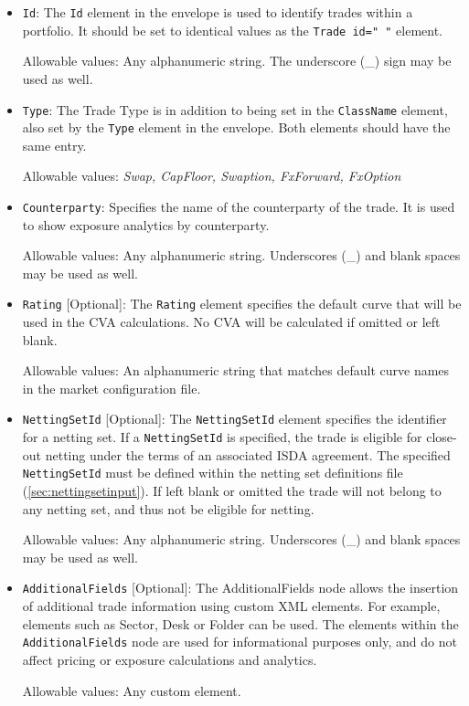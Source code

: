 \begin{itemize}
\item {\tt Id}: The {\tt Id} element in the envelope is used to identify trades within a portfolio. It should be set to
  identical values as the {\tt Trade id=" "} element.

  Allowable values: Any alphanumeric string. The underscore (\_) sign may be used as well.

\item {\tt Type}: The Trade Type is in addition to being set in the {\tt ClassName} element, also set by the {\tt Type}
  element in the envelope. Both elements should have the same entry.

Allowable values: \emph{Swap, CapFloor, Swaption, FxForward, FxOption }

\item {\tt Counterparty}: Specifies the name of the counterparty of the trade.  It is used to show exposure analytics by
  counterparty.

Allowable values: Any alphanumeric string. Underscores (\_) and blank spaces may be used as well. 

\item {\tt Rating} [Optional]: The {\tt Rating} element specifies the default curve that will be used in the CVA
  calculations.  No CVA will be calculated if omitted or left blank.

Allowable values: An alphanumeric string that matches default curve names in the market configuration file.  

\item {\tt NettingSetId} [Optional]: The {\tt NettingSetId} element specifies the identifier for a netting set. If a
  \lstinline!NettingSetId! is specified, the trade is eligible for close-out netting under the terms of an associated
  ISDA agreement. The specified {\tt NettingSetId} must be defined within the netting set definitions file
  (\ref{sec:nettingsetinput}). If left blank or omitted the trade will not belong to any netting set, and thus not be
  eligible for netting.

Allowable values: Any alphanumeric string. Underscores (\_) and blank spaces may be used as well. 


\item \lstinline!AdditionalFields! [Optional]: The AdditionalFields node allows the insertion of additional trade
  information using custom XML elements.  For example, elements such as Sector, Desk or Folder can be used. The elements
  within the \lstinline!AdditionalFields! node are used for informational purposes only, and do not affect pricing or
  exposure calculations and analytics.

Allowable values: Any custom element.

\end{itemize}

